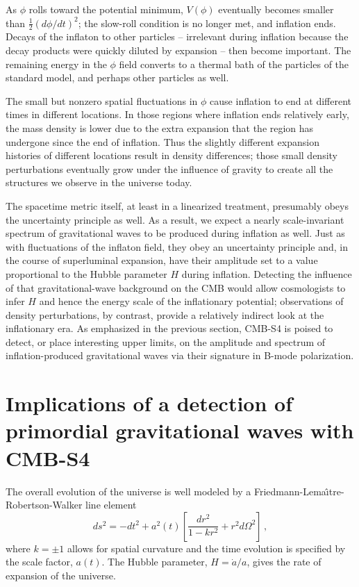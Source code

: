 As $\phi$ rolls toward the potential minimum, $V(\phi)$ eventually becomes smaller than $\frac{1}{2}(d\phi/dt)^2$; the slow-roll condition is no longer met, and inflation ends. Decays of the inflaton to other particles -- irrelevant during inflation because the decay products were quickly diluted by expansion -- then become important. The remaining energy in the $\phi$ field converts to a thermal bath of the particles of the standard model, and perhaps other particles as well.

The small but nonzero spatial fluctuations in $\phi$ cause inflation to end at different times in different locations. In those regions where inflation ends relatively early, the mass density is lower due to the extra expansion that the region has undergone since the end of inflation. Thus the slightly different expansion histories of different locations result in density differences; those small density perturbations eventually grow under the influence of gravity to create all the structures we observe in the universe today.

The spacetime metric itself, at least in a linearized treatment, presumably obeys the uncertainty principle as well. As a result, we expect a nearly scale-invariant spectrum of gravitational waves to be produced during inflation as well. Just as with fluctuations of the inflaton field, they obey an uncertainty principle and, in the course of superluminal expansion, have their amplitude set to a value proportional to the Hubble parameter $H$ during inflation. Detecting the influence of that gravitational-wave background on the CMB would allow cosmologists to infer $H$ and hence the energy scale of the inflationary potential; observations of density perturbations, by contrast, provide a relatively indirect look at the inflationary era. As emphasized in the previous section, CMB-S4 is poised to detect, or place interesting upper limits, on the amplitude and spectrum of inflation-produced gravitational waves via their signature in B-mode polarization. 


\section{Implications of a detection of primordial gravitational waves with CMB-S4}
\label{sec:detection}
The overall evolution of the universe is well modeled by a Friedmann-Lema\^{\i}tre-Robertson-Walker line element
\begin{equation}
ds^2=-dt^2+a^2(t)\left[\frac{dr^2}{1-kr^2}+r^2d\Omega^2\right]\,,
\end{equation}
where $k=\pm1$ allows for spatial curvature and the time evolution is specified by the scale factor, $a(t)$. The Hubble parameter, $H=\dot{a}/a$, gives the rate of expansion of the universe. 

